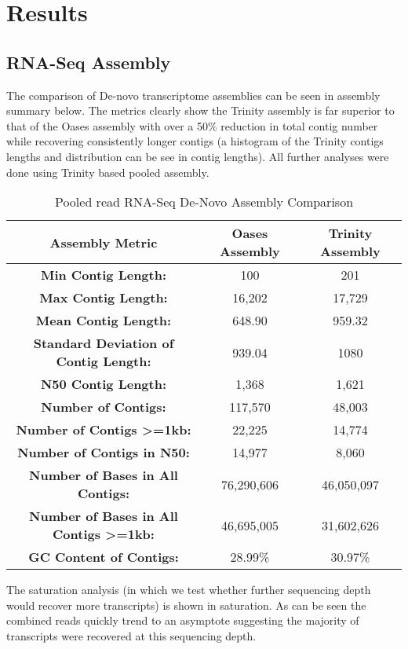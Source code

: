 \section{Results}
\subsection{RNA-Seq Assembly}
The comparison of De-novo transcriptome assemblies can be seen in assembly summary below.
The metrics clearly show the Trinity assembly is far superior to that of the Oases assembly with over a 50\% reduction in total contig number while recovering consistently longer contigs (a histogram of the Trinity contigs lengths and distribution can be see in contig lengths). 
All further analyses were done using Trinity based pooled assembly.

\begin{table}
\centering
\begin{tabular}{| c || c | c |}
\hline
\textbf{Assembly Metric} & \textbf{Oases Assembly} & \textbf{Trinity Assembly} \\
\hline
\textbf{Min Contig Length:} & 100 & 201\\
\textbf{Max Contig Length:} & 16,202 & 17,729\\
\textbf{Mean Contig Length:} & 648.90 & 959.32\\
\textbf{Standard Deviation of Contig Length:} & 939.04 & 1080\\
\textbf{N50 Contig Length:} & 1,368 & 1,621 \\
\textbf{Number of Contigs:} & 117,570 & 48,003\\
\textbf{Number of Contigs >=1kb:} & 22,225 & 14,774\\
\textbf{Number of Contigs in N50:} & 14,977 & 8,060\\
\textbf{Number of Bases in All Contigs:} & 76,290,606 & 46,050,097\\
\textbf{Number of Bases in All Contigs >=1kb:} & 46,695,005 & 31,602,626\\
\textbf{GC Content of Contigs:} & 28.99\% & 30.97\% \\
\hline
\end{tabular}

\caption{Pooled read RNA-Seq De-Novo Assembly Comparison}
\label{tab:assembly_summary}
\end{table}

The saturation analysis (in which we test whether further sequencing depth would recover more transcripts) is shown in saturation.  
As can be seen the combined reads quickly trend to an asymptote suggesting the majority of transcripts were recovered at this sequencing depth.

